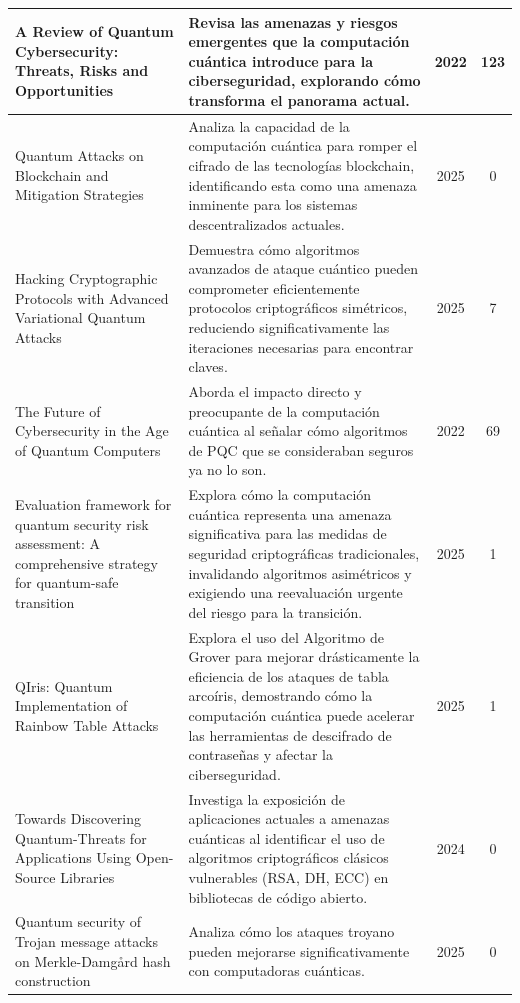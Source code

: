 \begin{longtable}{@{} p{4.5cm} p{6.5cm} c c @{}}
A Review of Quantum Cybersecurity: Threats, Risks and Opportunities~\cite{HossainFaruk2022} & Revisa las amenazas y riesgos emergentes que la computación cuántica introduce para la ciberseguridad, explorando cómo transforma el panorama actual. & 2022 & 123 \\
\hline
Quantum Attacks on Blockchain and Mitigation Strategies~\cite{RM2025} & Analiza la capacidad de la computación cuántica para romper el cifrado de las tecnologías blockchain, identificando esta como una amenaza inminente para los sistemas descentralizados actuales. & 2025 & 0 \\
\hline
Hacking Cryptographic Protocols with Advanced Variational Quantum Attacks~\cite{Aizpurua2025} & Demuestra cómo algoritmos avanzados de ataque cuántico pueden comprometer eficientemente protocolos criptográficos simétricos, reduciendo significativamente las iteraciones necesarias para encontrar claves. & 2025 & 7 \\
\hline
The Future of Cybersecurity in the Age of Quantum Computers~\cite{Raheman2022} & Aborda el impacto directo y preocupante de la computación cuántica al señalar cómo algoritmos de PQC que se consideraban seguros ya no lo son. & 2022 & 69 \\
\hline
Evaluation framework for quantum security risk assessment: A comprehensive strategy for quantum-safe transition~\cite{BASERI2025} & Explora cómo la computación cuántica representa una amenaza significativa para las medidas de seguridad criptográficas tradicionales, invalidando algoritmos asimétricos y exigiendo una reevaluación urgente del riesgo para la transición. & 2025 & 1 \\
\hline
QIris: Quantum Implementation of Rainbow Table Attacks~\cite{Quan2025} & Explora el uso del Algoritmo de Grover para mejorar drásticamente la eficiencia de los ataques de tabla arcoíris, demostrando cómo la computación cuántica puede acelerar las herramientas de descifrado de contraseñas y afectar la ciberseguridad. & 2025 & 1 \\
\hline
Towards Discovering Quantum-Threats for Applications Using Open-Source Libraries~\cite{Ye2024} & Investiga la exposición de aplicaciones actuales a amenazas cuánticas al identificar el uso de algoritmos criptográficos clásicos vulnerables (RSA, DH, ECC) en bibliotecas de código abierto. & 2024 & 0 \\
\hline
Quantum security of Trojan message attacks on Merkle-Damgård hash construction~\cite{Xu2025} & Analiza cómo los ataques troyano pueden mejorarse significativamente con computadoras cuánticas. & 2025 & 0 \\

\end{longtable}
